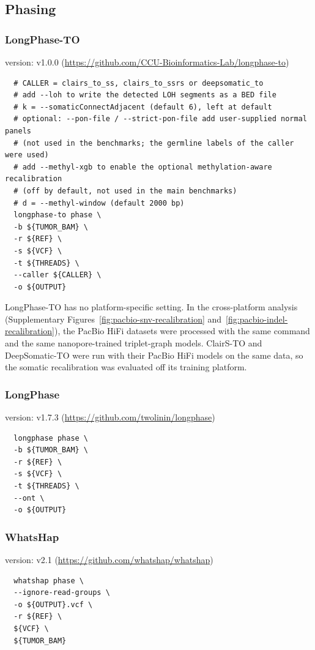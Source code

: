 \documentclass[pdflatex,sn-nature]{sn-jnl}
\begin{document}
\subsection{Phasing}
\subsubsection{LongPhase-TO}
version: v1.0.0 (\url{https://github.com/CCU-Bioinformatics-Lab/longphase-to})
\label{supp:longphaseto}
\begin{verbatim}
  # CALLER = clairs_to_ss, clairs_to_ssrs or deepsomatic_to
  # add --loh to write the detected LOH segments as a BED file
  # k = --somaticConnectAdjacent (default 6), left at default
  # optional: --pon-file / --strict-pon-file add user-supplied normal panels
  # (not used in the benchmarks; the germline labels of the caller were used)
  # add --methyl-xgb to enable the optional methylation-aware recalibration
  # (off by default, not used in the main benchmarks)
  # d = --methyl-window (default 2000 bp)
  longphase-to phase \
  -b ${TUMOR_BAM} \
  -r ${REF} \
  -s ${VCF} \
  -t ${THREADS} \
  --caller ${CALLER} \
  -o ${OUTPUT}
\end{verbatim}

\noindent LongPhase-TO has no platform-specific setting. In the cross-platform analysis (Supplementary Figures~\ref{fig:pacbio-snv-recalibration} and~\ref{fig:pacbio-indel-recalibration}), the PacBio HiFi datasets were processed with the same command and the same nanopore-trained triplet-graph models. ClairS-TO and DeepSomatic-TO were run with their PacBio HiFi models on the same data, so the somatic recalibration was evaluated off its training platform.

\subsubsection{LongPhase}
version: v1.7.3 (\url{https://github.com/twolinin/longphase})
\label{supp:longphase}
\begin{verbatim}
  longphase phase \
  -b ${TUMOR_BAM} \
  -r ${REF} \
  -s ${VCF} \
  -t ${THREADS} \
  --ont \
  -o ${OUTPUT}
\end{verbatim}

\subsubsection{WhatsHap}
version: v2.1 (\url{https://github.com/whatshap/whatshap})
\label{supp:whatshap}
\begin{verbatim}
  whatshap phase \
  --ignore-read-groups \
  -o ${OUTPUT}.vcf \
  -r ${REF} \
  ${VCF} \
  ${TUMOR_BAM}
\end{verbatim}
\end{document}
